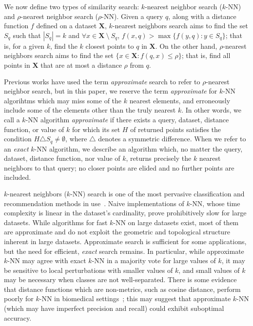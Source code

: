 {\color{red} We now define two types of similarity search: $k$-nearest neighbor search ($k$-NN) and $\rho$-nearest neighbor search ($\rho$-NN). 
Given a query $q$, along with a distance function $f$ defined on a dataset $\textbf{X}$, $k$-nearest neighbors search aims to find 
the set $S_q$ such that  $|S_q| = k$ and $\forall x \in \textbf{X} \ \setminus \ S_q$, $f(x, q) > \max\{f(y, q): y \in S_q \}$;
that is, for a given $k$, find the $k$ closest points to $q$ in $ \textbf{X}$.
On the other hand, $\rho$-nearest neighbors search aims to find the set $\{x \in \textbf{X}: f(q, x) \leq \rho \}$;
that is, find all points in $\textbf{X}$ that are at most a distance $\rho$ from $q$.}




{\color{red} 
Previous works have used the term \emph{approximate} search to refer to $\rho$-nearest neighbor search, but in this paper, 
we reserve the term \emph{approximate} for $k$-NN algorihtms which may miss some of the $k$ nearest elements, and erroneously include some of the elements other than the truly nearest $k$.
In other words, we call a $k$-NN algorithm \emph{approximate} if there exists a query, dataset, distance function, or value of $k$ for which its set $H$ of returned points satisfies the condition $H \triangle S_q \neq \emptyset$, where $\triangle$ denotes a symmetric difference.
When we refer to an \emph{exact} $k$-NN algorithm, we describe an algorithm which, no matter the query, dataset, distance function, nor value of $k$, returns precisely the $k$ nearest neighbors to that query;
no closer points are elided and no further points are included. }


$k$-nearest neighbors ($k$-NN) search is one of the most pervasive classification and recommendation methods in use~\cite{fix1952discriminatory, cover1967nearest}. 
Naive implementations of $k$-NN, whose time complexity is linear in the dataset's cardinality, prove prohibitively slow for large datasets.
While algorithms for fast $k$-NN on large datasets exist, most of them are approximate and do not exploit the geometric and topological structure inherent in large datasets.
Approximate search is sufficient for some applications, but the need for efficient, \emph{exact} search remains.
In particular, while approximate $k$-NN may agree with exact $k$-NN in a majority vote for large values of $k$, it may be sensitive to local perturbations with smaller values of $k$, and small values of $k$ may be necessary when classes are not well-separated.
There is some evidence that distance functions which are non-metrics, such as cosine distance, perform poorly for $k$-NN in biomedical settings~\cite{hu2016distance};
this may suggest that approximate $k$-NN (which may have imperfect precision and recall) could exhibit suboptimal accuracy.

